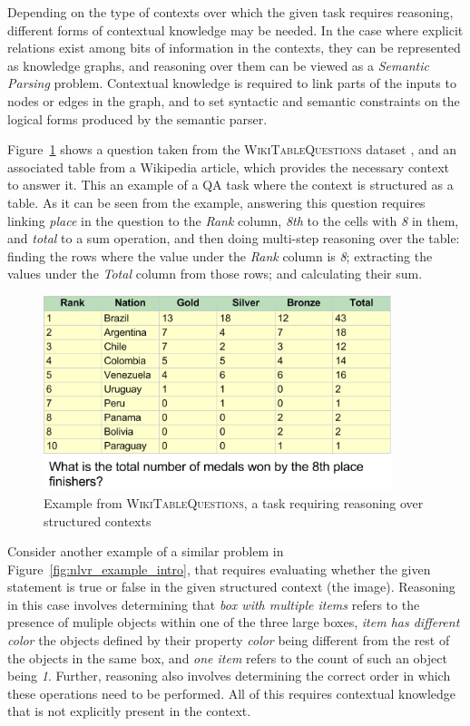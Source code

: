 Depending on the type of contexts over which the given task requires reasoning, different forms of contextual knowledge may be needed. 
In the case where explicit relations exist among bits of information in the contexts, they can be represented as knowledge graphs, and reasoning
over them can be viewed as a \emph{Semantic Parsing} problem. Contextual knowledge is required to link parts of the inputs to nodes or edges in the graph, and to set syntactic and
semantic constraints on the logical forms produced by the semantic parser.

Figure~\ref{fig:wikitables_example} shows a question taken from the \textsc{WikiTableQuestions} dataset \citep{pasupat2015compositional}, and an associated table from a Wikipedia article,
which provides the necessary context to answer it. This an example of a QA task where the context is structured as a table. As it can be seen from the example, answering this
question requires linking \textit{place} in the question to the \textit{Rank} column, \textit{8th} to the cells with \textit{8} in them, and \textit{total} to a sum operation, and then
doing multi-step reasoning over the table: finding the rows where the value under the \textit{Rank} column is \textit{8}; extracting the values under the \textit{Total} column from those rows; and calculating their sum.
\begin{figure}
	\begin{center}
	\includegraphics[width=4in]{figures/wikitables_example.png}
	\caption{Example from \textsc{WikiTableQuestions}, a task requiring reasoning over structured contexts}\label{fig:wikitables_example}
	\end{center}
\end{figure}

Consider another example of a similar problem in Figure~\ref{fig:nlvr_example_intro}, that requires evaluating whether the given statement is true or false
in the given structured context (the image). Reasoning in this case involves determining that \textit{box with multiple items} refers to the presence of muliple objects within one of the three
large boxes, \textit{item has different color} the objects defined by their property \textit{color} being different from the rest of the objects in the same box,
and \textit{one item} refers to the count of such an object being \textit{1}. Further, reasoning also
involves determining the correct order in which these operations need to be performed. All of this requires contextual knowledge that is not explicitly present in the context.

